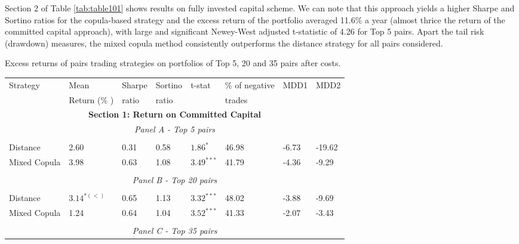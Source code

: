 \documentclass[a4paper]{article}
\begin{document}
Section 2 of Table \ref{tab:table101} shows results on fully invested capital scheme. We can note that this approach yields a higher Sharpe and Sortino ratios for the copula-based strategy and the excess return of the portfolio averaged 11.6\% a year (almost thrice the return of the committed capital approach), with large and significant Newey-West adjusted t-statistic of 4.26 for Top 5 pairs. Apart the tail risk (drawdown) measures, the mixed copula method consistently outperforms the distance strategy for all pairs considered.

\begin{threeparttable}[H]
	\centering \tiny
	\caption{Excess returns of pairs trading strategies on portfolios of Top 5, 20 and 35 pairs after costs.}
	\begin{tabularx}{\textwidth}{@{\extracolsep{\fill}}llllllll@{}}
		\toprule
		Strategy & Mean  & Sharpe & Sortino & t-stat & \% of negative   & MDD1 & MDD2 \\
		& Return (\% ) & ratio &  ratio     &  &  trades     &       &  \\
		\midrule
		\multicolumn{8}{c}{\textbf{Section 1: Return on Committed Capital}} \\
		\multicolumn{8}{c}{\textit{Panel A - Top 5 pairs}} \\
		&       &       &       &       &       &       &  \\
		Distance & 2.60  & 0.31  & 0.58  & $1.86^{*}$  & 46.98 & -6.73    & -19.62 \\
		Mixed Copula &  3.98  &  0.63  & 1.08  &  $3.49^{***}$  &  41.79 &  -4.36  &  -9.29 \\
		\multicolumn{1}{r}{} & \multicolumn{1}{r}{} & \multicolumn{1}{r}{} & \multicolumn{1}{r}{} & \multicolumn{1}{r}{} & \multicolumn{1}{r}{} & \multicolumn{1}{r}{} & \multicolumn{1}{r}{} \\
		\multicolumn{8}{c}{\textit{Panel B - Top 20 pairs}} \\
		&       &       &       &       &       &       &  \\
		Distance &  $3.14^{*(<)}$  &  0.65  & 1.13  & $3.32^{***}$  & 48.02 & -3.88  & -9.69 \\
		Mixed Copula  & 1.24  & 0.64  & 1.04  & $3.52^{***}$  & 41.33 &  -2.07  &  -3.43  \\
		\multicolumn{1}{r}{} & \multicolumn{1}{r}{} & \multicolumn{1}{r}{} & \multicolumn{1}{r}{} & \multicolumn{1}{r}{} & \multicolumn{1}{r}{} & \multicolumn{1}{r}{} & \multicolumn{1}{r}{} \\
		\multicolumn{8}{c}{\textit{Panel C - Top 35 pairs}} \\

\end{tabularx}
\end{threeparttable}
\end{document}
